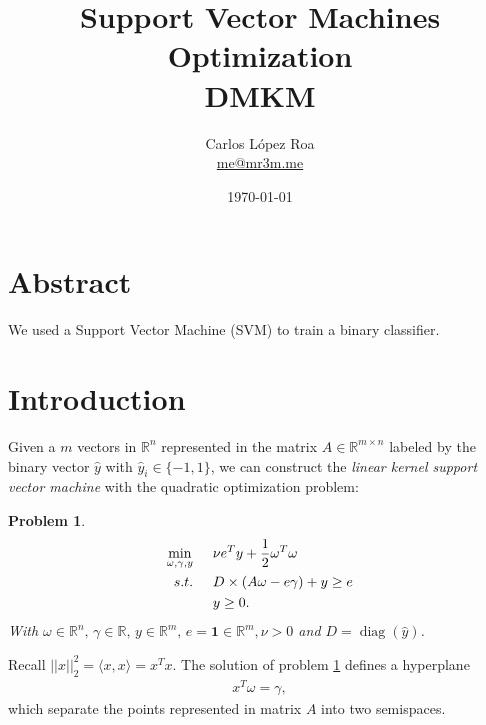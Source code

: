 \documentclass[a4paper,10pt,twocolumn]{article}
\title{Support Vector Machines\\ Optimization \\ DMKM}
\author{Carlos López Roa\\ \href{mailto:me@mr3m.me}{me@mr3m.me} }
\date{\today}
\newcommand{\R}{\ensuremath{\mathbb{R}}}
\DeclareMathOperator{\diag}{\mathrm{diag}}
\newtheorem{prob}{Problem}
\begin{document}
\maketitle
{}
\section*{Abstract}
We used a Support Vector Machine (SVM) to train a binary classifier. 
\section*{Introduction}
Given a $m$ vectors in $\mathbb{R}^n$ represented in the matrix $A \in \R^{m\times n}$ labeled by the binary vector $\hat{y}$ with $\hat{y}_i \in \{-1,1\}$, we can construct the \emph{linear kernel support vector machine} with the quadratic optimization problem: 
\begin{prob}\label{prob1}
\begin{equation}
\begin{aligned}
\min_{\omega,\gamma,y} &\hspace{0.5cm} \nu e^T y +\frac{1}{2}\omega^T\omega\\
s.t. &\hspace{0.5cm} D\times(A\omega - e \gamma)+y\geq e\\
&\hspace{0.5cm} y \geq 0.
\end{aligned}
\end{equation}
With $\omega \in \mathbb{R}^n, \, \gamma \in \R, \, y \in \R^m, \, e=\mathbf{1} \in\mathbb{R}^m, \nu >0$ and $D=\diag(\hat{y})$.
\end{prob}
Recall $||x||_2^2=\langle x,x\rangle=x^Tx$. The solution of problem \ref{prob1}  defines a hyperplane 
\begin{equation}
\begin{aligned}
x^T\omega = \gamma, 
\end{aligned}
\end{equation}
which separate the points represented in matrix $A$ into two semispaces.
\end{document}
